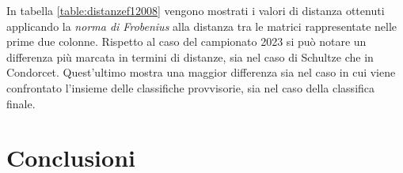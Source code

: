 \documentclass[12pt,a4paper,openright,twoside]{book}
\begin{document}
 In tabella \ref{table:distanzef12008} vengono mostrati i valori di distanza ottenuti applicando la 
 \textit{norma di Frobenius} alla distanza tra le matrici rappresentate nelle prime due colonne.
 Rispetto al caso del campionato 2023 si può notare un differenza più marcata in termini di distanze, sia nel caso
 di Schultze che in Condorcet. Quest'ultimo mostra una maggior differenza sia nel caso in cui viene confrontato
 l'insieme delle classifiche provvisorie, sia nel caso della classifica finale.
 \begin{table}[H]
    \centering
    \begingroup
    \endgroup

    \caption{Campionato \textit{F1} 2008 - Valori di distanza ottenuti applicando la 
    \textit{norma di Frobenius} alla differenza delle matrici rappresentate nelle prime due colonne.
    }
    \label{table:distanzef12008}
\end{table}
\chapter{Conclusioni}





%
%
%
\end{document}
